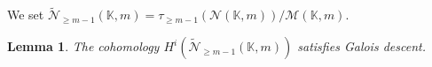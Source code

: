 \documentclass[12pt]{extarticle}
\newtheorem{lemma}[theorem]{Lemma}
\def\mb{\mathbb}
\def\mc{\mathcal}
\def\k{\mb K}
\def\t{\times}
\def\wt{\widetilde}
\renewcommand{\P}{{\mb P}}
\def\PP{\mathbb P^1\times\mathbb P^1}
\def \CH{\mc{N}}
\def \wCH{\wt{\CH}_{\geq m-1}}
\def \M{\mc M}
\DeclareMathOperator{\spec}{Spec}
\begin{document}



We set $\wCH(\k,m)=\tau_{\geq m-1}(\CH(\k,m))/\M(\k,m)$.

\begin{lemma}
\label{lemma:Galois_descent}
    The cohomology $H^i(\wCH(\k,m))$ satisfies Galois descent.
\end{lemma}
\end{document}
